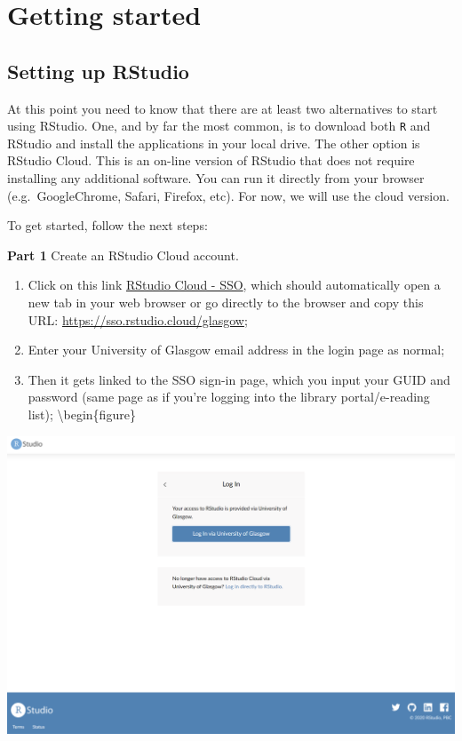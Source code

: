 \documentclass[
]{book}
\providecommand{\tightlist}{%
  \setlength{\itemsep}{0pt}\setlength{\parskip}{0pt}}
\begin{document}
\hypertarget{getting-started}{%
\section{Getting started}\label{getting-started}}

\hypertarget{setting-up-rstudio}{%
\subsection{Setting up RStudio}\label{setting-up-rstudio}}

At this point you need to know that there are at least two alternatives to start using RStudio. One, and by far the most common, is to download both \texttt{R} and RStudio and install the applications in your local drive. The other option is RStudio Cloud. This is an on-line version of RStudio that does not require installing any additional software. You can run it directly from your browser (e.g.~GoogleChrome, Safari, Firefox, etc). For now, we will use the cloud version.

To get started, follow the next steps:

\textbf{Part 1} Create an RStudio Cloud account.

\begin{enumerate}
\def\labelenumi{\arabic{enumi}.}
\tightlist
\item
  Click on this link \href{https://sso.rstudio.cloud/glasgow}{RStudio Cloud - SSO}, which should automatically open a new tab in your web browser or go directly to the browser and copy this URL: \url{https://sso.rstudio.cloud/glasgow};
\item
  Enter your University of Glasgow email address in the login page as normal;
\item
  Then it gets linked to the SSO sign-in page, which you input your GUID and password (same page as if you're logging into the library portal/e-reading list);
  \textbackslash begin\{figure\}
\end{enumerate}

\includegraphics[width=1\linewidth]{./images/sso_login} \hfill{}
\end{document}
